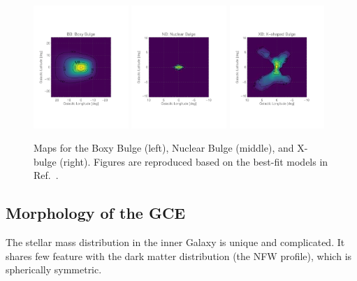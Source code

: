 \documentclass[doublespace,nopageskip]{VTthesis} %
\begin{document}
\begin{figure}
    \centering
    \includegraphics[width=0.32\textwidth]{Figures/511keV/map_BB_asinh_grid.pdf}
    \includegraphics[width=0.32\textwidth]{Figures/511keV/map_NB_log_grid_20x20.pdf}
    \includegraphics[width=0.32\textwidth]{Figures/511keV/map_XB_asinh_grid_20x20.pdf}
    \caption{Maps for the Boxy Bulge (left), Nuclear Bulge (middle), and X-bulge (right). Figures are reproduced based on the best-fit models in Ref.~\cite{1998ApJ...492..495F, 2002A&A...384..112L,2016AJ....152...14N}.}
    \label{fig:bulge_templates}
\end{figure}

\subsection{Morphology of the GCE}

The stellar mass distribution in the inner Galaxy is unique and complicated. It shares few feature with the dark matter distribution (the NFW profile), which is spherically symmetric. 
\end{document}
